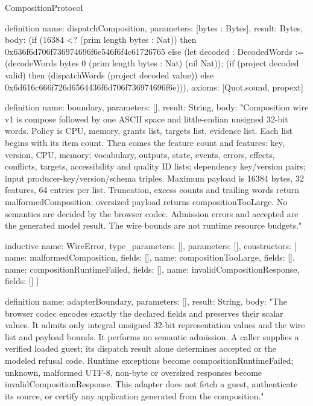 \begin{lexlean}{CompositionProtocol}
\begin{semanticmodule}
definition{
  name: dispatchComposition,
  parameters: [bytes : Bytes],
  result: Bytes,
  body: (if (16384 <? (prim length bytes : Nat)) then 0x636f6d706f736974696f6e546f6f4c61726765 else (let decoded : DecodedWords := (decodeWords bytes 0 (prim length bytes : Nat) (nil Nat)); (if (project decoded valid) then (dispatchWords (project decoded value)) else 0x6d616c666f726d6564436f6d706f736974696f6e))),
  axioms: [Quot.sound, propext]
}

definition{
  name: boundary,
  parameters: [],
  result: String,
  body: "Composition wire v1 is compose followed by one ASCII space and little-endian unsigned 32-bit words. Policy is CPU, memory, grants list, targets list, evidence list. Each list begins with its item count. Then comes the feature count and features: key, version, CPU, memory; vocabulary, outputs, state, events, errors, effects, conflicts, targets, accessibility and quality ID lists; dependency key/version pairs; input producer-key/version/schema triples. Maximum payload is 16384 bytes, 32 features, 64 entries per list. Truncation, excess counts and trailing words return malformedComposition; oversized payload returns compositionTooLarge. No semantics are decided by the browser codec. Admission errors and accepted are the generated model result. The wire bounds are not runtime resource budgets."
}

inductive{
  name: WireError,
  type_parameters: [],
  parameters: [],
  constructors: [
    {name: malformedComposition, fields: []},
    {name: compositionTooLarge, fields: []},
    {name: compositionRuntimeFailed, fields: []},
    {name: invalidCompositionResponse, fields: []}
  ]
}

definition{
  name: adapterBoundary,
  parameters: [],
  result: String,
  body: "The browser codec encodes exactly the declared fields and preserves their scalar values. It admits only integral unsigned 32-bit representation values and the wire list and payload bounds. It performs no semantic admission. A caller supplies a verified loaded guest; its dispatch result alone determines accepted or the modeled refusal code. Runtime exceptions become compositionRuntimeFailed; unknown, malformed UTF-8, non-byte or oversized responses become invalidCompositionResponse. This adapter does not fetch a guest, authenticate its source, or certify any application generated from the composition."
}
\end{semanticmodule}
\end{lexlean}

